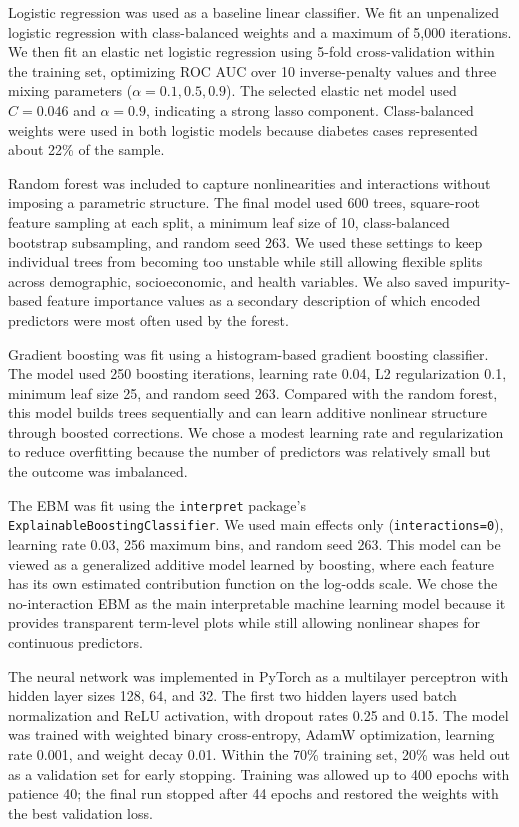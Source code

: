 \documentclass[10pt]{article}
\begin{document}
Logistic regression was used as a baseline linear classifier. We fit an unpenalized logistic regression with class-balanced weights and a maximum of 5,000 iterations. We then fit an elastic net logistic regression using 5-fold cross-validation within the training set, optimizing ROC AUC over 10 inverse-penalty values and three mixing parameters ($\alpha=0.1,0.5,0.9$). The selected elastic net model used $C=0.046$ and $\alpha=0.9$, indicating a strong lasso component. Class-balanced weights were used in both logistic models because diabetes cases represented about 22\% of the sample.

Random forest was included to capture nonlinearities and interactions without imposing a parametric structure. The final model used 600 trees, square-root feature sampling at each split, a minimum leaf size of 10, class-balanced bootstrap subsampling, and random seed 263. We used these settings to keep individual trees from becoming too unstable while still allowing flexible splits across demographic, socioeconomic, and health variables. We also saved impurity-based feature importance values as a secondary description of which encoded predictors were most often used by the forest.

Gradient boosting was fit using a histogram-based gradient boosting classifier. The model used 250 boosting iterations, learning rate 0.04, L2 regularization 0.1, minimum leaf size 25, and random seed 263. Compared with the random forest, this model builds trees sequentially and can learn additive nonlinear structure through boosted corrections. We chose a modest learning rate and regularization to reduce overfitting because the number of predictors was relatively small but the outcome was imbalanced.

The EBM was fit using the \texttt{interpret} package's \texttt{ExplainableBoostingClassifier}. We used main effects only (\texttt{interactions=0}), learning rate 0.03, 256 maximum bins, and random seed 263. This model can be viewed as a generalized additive model learned by boosting, where each feature has its own estimated contribution function on the log-odds scale. We chose the no-interaction EBM as the main interpretable machine learning model because it provides transparent term-level plots while still allowing nonlinear shapes for continuous predictors.

The neural network was implemented in PyTorch as a multilayer perceptron with hidden layer sizes 128, 64, and 32. The first two hidden layers used batch normalization and ReLU activation, with dropout rates 0.25 and 0.15. The model was trained with weighted binary cross-entropy, AdamW optimization, learning rate 0.001, and weight decay 0.01. Within the 70\% training set, 20\% was held out as a validation set for early stopping. Training was allowed up to 400 epochs with patience 40; the final run stopped after 44 epochs and restored the weights with the best validation loss.
\end{document}
